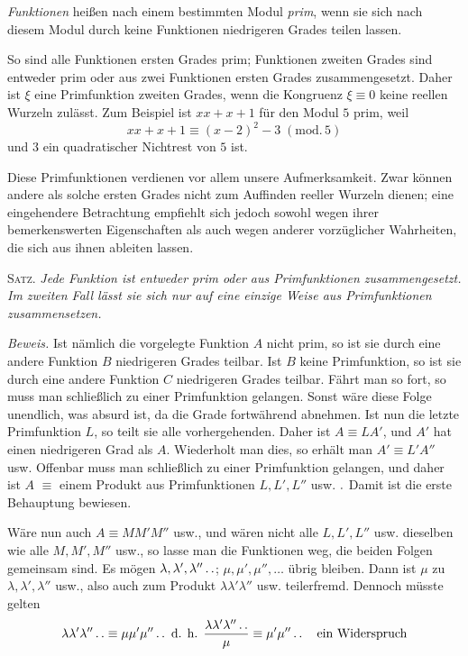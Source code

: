\emph{Funktionen} heißen nach einem bestimmten Modul \emph{prim}, wenn sie sich nach diesem Modul durch keine Funktionen niedrigeren Grades teilen lassen.

So sind alle Funktionen ersten Grades prim; Funktionen zweiten Grades sind entweder prim oder aus zwei Funktionen ersten Grades zusammengesetzt. Daher ist $\xi$ eine Primfunktion zweiten Grades, wenn die Kongruenz $\xi\equiv0$ keine reellen Wurzeln zulässt. Zum Beispiel ist $xx+x+1$ für den Modul $5$ prim, weil
\[
xx+x+1\equiv(x-2)^2-3\;(\mathrm{mod.}\,5)
\]
und $3$ ein quadratischer Nichtrest von $5$ ist.

Diese Primfunktionen verdienen vor allem unsere Aufmerksamkeit. Zwar können andere als solche ersten Grades nicht zum Auffinden reeller Wurzeln dienen; eine eingehendere Betrachtung empfiehlt sich jedoch sowohl wegen ihrer bemerkenswerten Eigenschaften als auch wegen anderer vorzüglicher Wahrheiten, die sich aus ihnen ableiten lassen.

\textsc{Satz.} \emph{Jede Funktion ist entweder prim oder aus Primfunktionen zusammengesetzt. Im zweiten Fall lässt sie sich nur auf eine einzige Weise aus Primfunktionen zusammensetzen.}

\emph{Beweis.} Ist nämlich die vorgelegte Funktion $A$ nicht prim, so ist sie durch eine andere Funktion $B$ niedrigeren Grades teilbar. Ist $B$ keine Primfunktion, so ist sie durch eine andere Funktion $C$ niedrigeren Grades teilbar. Fährt man so fort, so muss man schließlich zu einer Primfunktion gelangen. Sonst wäre diese Folge unendlich, was absurd ist, da die Grade fortwährend abnehmen. Ist nun die letzte Primfunktion $L$, so teilt sie alle vorhergehenden. Daher ist $A\equiv LA'$, und $A'$ hat einen niedrigeren Grad als $A$. Wiederholt man dies, so erhält man $A'\equiv L'A''$ usw. Offenbar muss man schließlich zu einer Primfunktion gelangen, und daher ist $A$ $\equiv$ einem Produkt aus Primfunktionen $L,L',L''$ usw. $\mathbin{.}$ Damit ist die erste Behauptung bewiesen.

Wäre nun auch $A\equiv MM'M''$ usw., und wären nicht alle $L,L',L''$ usw. dieselben wie alle $M,M',M''$ usw., so lasse man die Funktionen weg, die beiden Folgen gemeinsam sind.
Es mögen $\lambda,\lambda',\lambda''\mathinner{.\,.}$; $\mu,\mu',\mu'',\ldots$ übrig bleiben. Dann ist $\mu$ zu $\lambda,\lambda',\lambda''$ usw., also auch zum Produkt $\lambda\lambda'\lambda''$ usw. teilerfremd. Dennoch müsste gelten
\[
\lambda\lambda'\lambda''\mathinner{.\,.}\equiv\mu\mu'\mu''\mathinner{.\,.}\text{ d. h. }\frac{\lambda\lambda'\lambda''\mathinner{.\,.}}{\mu}\equiv\mu'\mu''\mathinner{.\,.}\quad\text{ein Widerspruch}
\]
